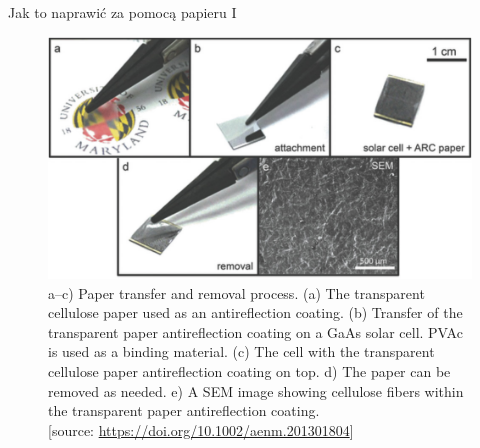 \documentclass{beamer}
\begin{document}
\begin{frame}{Jak to naprawić za pomocą papieru I}
    \begin{figure}[h]
        \centering
        \includegraphics[width=0.75\linewidth]{fig2.png}
        \caption{a–c) Paper transfer and removal process. (a) The transparent cellulose paper used as an antireflection coating. (b) Transfer of the transparent paper antireflection coating on a GaAs solar cell. PVAc is used as a binding material. (c) The cell with the transparent cellulose paper antireflection coating on top. d) The paper can be removed as needed. e) A SEM image showing cellulose fibers within the transparent paper antireflection coating.\\
        \typeout{}
        [source: \url{https://doi.org/10.1002/aenm.201301804}]
        }
        
    \end{figure}

\end{frame}
\end{document}
